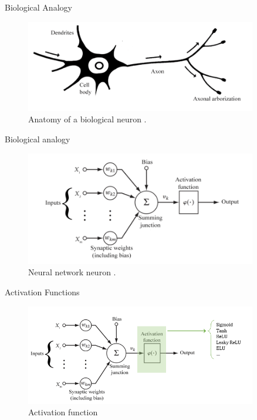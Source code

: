 \begin{frame}{Biological Analogy}
    \begin{figure}[H]
		\centering
		\includegraphics[width=0.9\textwidth]{Figs/biological_neuron.png}
		\caption{Anatomy of a biological neuron \cite{biological-and-nn-neuron}.}
	\end{figure}
\end{frame}

\begin{frame}{Biological analogy}
    \begin{figure}[H]
		\centering
		\includegraphics[width=0.9\textwidth]{Figs/nn_neuron.png}
		\caption{Neural network neuron \cite{biological-and-nn-neuron}.}
	\end{figure}
\end{frame}

\begin{frame}{Activation Functions}
    \begin{figure}[H]
		\centering
		\includegraphics[width=0.9\textwidth]{Figs/activation_function_1.png}
		\caption{Activation function}
	\end{figure}
\end{frame}

